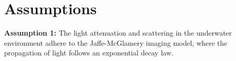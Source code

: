 \section{Assumptions}


\textbf{Assumption 1:} The light attenuation and scattering in the underwater environment adhere to the Jaffe-McGlamery imaging model, where the propagation of light follows an exponential decay law.


